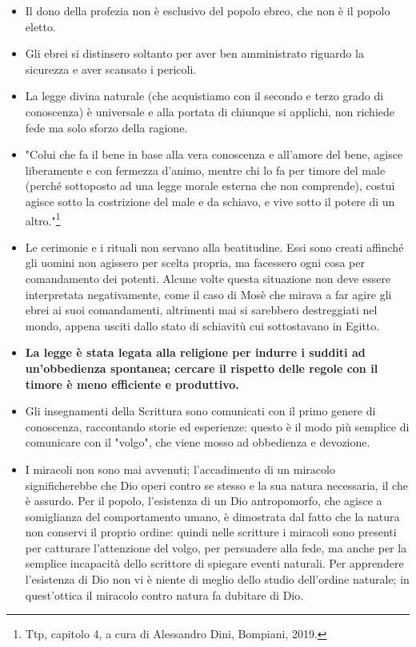 \begin{itemize}
	\item Il dono della profezia non è esclusivo del popolo ebreo, che non è il popolo eletto.
	\item Gli ebrei  si distinsero soltanto per aver ben amministrato riguardo la sicurezza e aver scansato i pericoli.
	\item  La legge divina naturale (che acquistiamo con il secondo e terzo grado di conoscenza) è universale e alla portata di chiunque si applichi, non richiede fede ma solo sforzo della ragione.
	\item "Colui che fa il bene in base alla vera conoscenza e all'amore del bene, agisce liberamente e con fermezza d'animo, mentre chi lo fa per timore del male (perché sottoposto ad una legge morale esterna che non comprende), costui agisce sotto la costrizione del male e da schiavo, e vive sotto il potere di un altro."\footnote{Ttp, capitolo 4, a cura di Alessandro Dini, Bompiani, 2019.}
	\item Le cerimonie e i rituali non servano alla beatitudine. Essi sono creati affinché gli uomini non agissero per scelta propria, ma facessero ogni cosa per comandamento dei potenti. Alcune volte questa situazione non deve essere interpretata negativamente, come il caso di Mosè che mirava a far agire gli ebrei ai suoi comandamenti, altrimenti mai si sarebbero destreggiati nel mondo, appena usciti dallo stato di schiavitù cui sottostavano in Egitto.
	\item \textbf{La legge è stata legata alla religione per indurre i sudditi ad un'obbedienza spontanea; cercare il rispetto delle regole con il timore è meno efficiente e produttivo.}
	\item Gli insegnamenti della Scrittura sono comunicati con il primo genere di conoscenza, raccontando storie ed esperienze: questo è il modo più semplice di comunicare con il "volgo", che viene mosso ad obbedienza e devozione.
	\item I miracoli non sono mai avvenuti; l'accadimento di un miracolo significherebbe che Dio operi contro se stesso e la sua natura necessaria, il che è assurdo. Per il popolo, l'esistenza di un Dio antropomorfo, che agisce a somiglianza del comportamento umano, è dimostrata dal fatto che la natura non conservi il proprio ordine: quindi nelle scritture i miracoli sono presenti per catturare l'attenzione del volgo, per persuadere alla fede, ma anche per la semplice incapacità dello scrittore di spiegare eventi naturali. Per apprendere l'esistenza di Dio non vi è niente di meglio dello studio dell'ordine naturale; in quest'ottica il miracolo contro natura fa dubitare di Dio.
\end{itemize}

